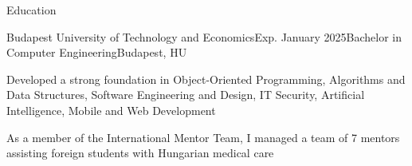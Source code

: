 \documentclass[
	a4paper, %
	11pt, %
]{resume} %
\begin{document}

\begin{rSection}{Education}

	\begin{rSubsection}{Budapest University of Technology and Economics}{Exp. January 2025}{Bachelor in Computer Engineering}{Budapest, HU}
		\item Developed a strong foundation in Object-Oriented Programming, Algorithms and Data Structures, Software Engineering and Design, IT Security, Artificial Intelligence, Mobile and Web Development
		\item As a member of the International Mentor Team, I managed a team of 7 mentors assisting foreign students with Hungarian medical care
	\end{rSubsection}

\end{rSection}

\end{document}
